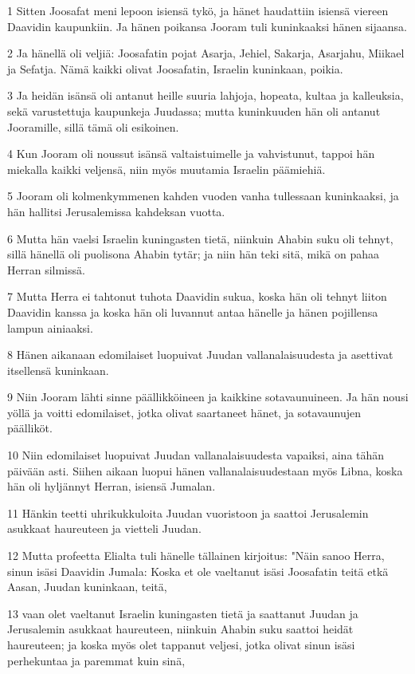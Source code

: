 \par 1 Sitten Joosafat meni lepoon isiensä tykö, ja hänet haudattiin isiensä viereen Daavidin kaupunkiin. Ja hänen poikansa Jooram tuli kuninkaaksi hänen sijaansa.
\par 2 Ja hänellä oli veljiä: Joosafatin pojat Asarja, Jehiel, Sakarja, Asarjahu, Miikael ja Sefatja. Nämä kaikki olivat Joosafatin, Israelin kuninkaan, poikia.
\par 3 Ja heidän isänsä oli antanut heille suuria lahjoja, hopeata, kultaa ja kalleuksia, sekä varustettuja kaupunkeja Juudassa; mutta kuninkuuden hän oli antanut Jooramille, sillä tämä oli esikoinen.
\par 4 Kun Jooram oli noussut isänsä valtaistuimelle ja vahvistunut, tappoi hän miekalla kaikki veljensä, niin myös muutamia Israelin päämiehiä.
\par 5 Jooram oli kolmenkymmenen kahden vuoden vanha tullessaan kuninkaaksi, ja hän hallitsi Jerusalemissa kahdeksan vuotta.
\par 6 Mutta hän vaelsi Israelin kuningasten tietä, niinkuin Ahabin suku oli tehnyt, sillä hänellä oli puolisona Ahabin tytär; ja niin hän teki sitä, mikä on pahaa Herran silmissä.
\par 7 Mutta Herra ei tahtonut tuhota Daavidin sukua, koska hän oli tehnyt liiton Daavidin kanssa ja koska hän oli luvannut antaa hänelle ja hänen pojillensa lampun ainiaaksi.
\par 8 Hänen aikanaan edomilaiset luopuivat Juudan vallanalaisuudesta ja asettivat itsellensä kuninkaan.
\par 9 Niin Jooram lähti sinne päällikköineen ja kaikkine sotavaunuineen. Ja hän nousi yöllä ja voitti edomilaiset, jotka olivat saartaneet hänet, ja sotavaunujen päälliköt.
\par 10 Niin edomilaiset luopuivat Juudan vallanalaisuudesta vapaiksi, aina tähän päivään asti. Siihen aikaan luopui hänen vallanalaisuudestaan myös Libna, koska hän oli hyljännyt Herran, isiensä Jumalan.
\par 11 Hänkin teetti uhrikukkuloita Juudan vuoristoon ja saattoi Jerusalemin asukkaat haureuteen ja vietteli Juudan.
\par 12 Mutta profeetta Elialta tuli hänelle tällainen kirjoitus: "Näin sanoo Herra, sinun isäsi Daavidin Jumala: Koska et ole vaeltanut isäsi Joosafatin teitä etkä Aasan, Juudan kuninkaan, teitä,
\par 13 vaan olet vaeltanut Israelin kuningasten tietä ja saattanut Juudan ja Jerusalemin asukkaat haureuteen, niinkuin Ahabin suku saattoi heidät haureuteen; ja koska myös olet tappanut veljesi, jotka olivat sinun isäsi perhekuntaa ja paremmat kuin sinä,
